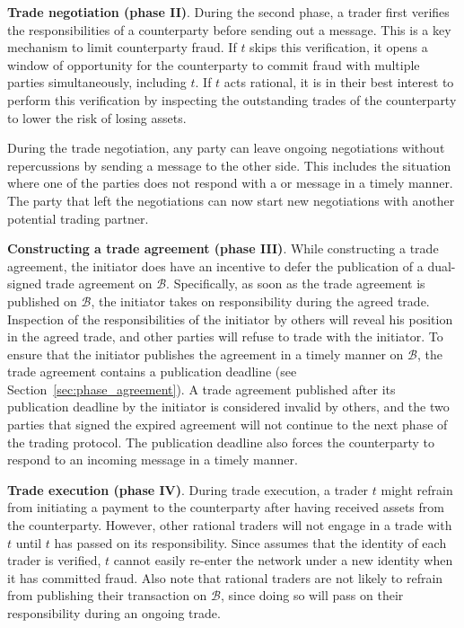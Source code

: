 \textbf{Trade negotiation (phase II)}.
During the second phase, a trader first verifies the responsibilities of a counterparty before sending out a \MsgTrdProp{} message.
This is a key mechanism to limit counterparty fraud.
If $ t $ skips this verification, it opens a window of opportunity for the counterparty to commit fraud with multiple parties simultaneously, including $ t $.
If $ t $ acts rational, it is in their best interest to perform this verification by inspecting the outstanding trades of the counterparty to lower the risk of losing assets.

During the trade negotiation, any party can leave ongoing negotiations without repercussions by sending a \MsgTrdReject{} message to the other side.
This includes the situation where one of the parties does not respond with a \MsgTrdNegotiate{} or \MsgTrdAccept{} message in a timely manner.
The party that left the negotiations can now start new negotiations with another potential trading partner.

\textbf{Constructing a trade agreement (phase III)}.
While constructing a trade agreement, the initiator does have an incentive to defer the publication of a dual-signed trade agreement on $ \mathcal{B} $.
Specifically, as soon as the trade agreement is published on $ \mathcal{B} $, the initiator takes on responsibility during the agreed trade.
Inspection of the responsibilities of the initiator by others will reveal his position in the agreed trade, and other parties will refuse to trade with the initiator.
To ensure that the initiator publishes the agreement in a timely manner on $ \mathcal{B} $, the trade agreement contains a publication deadline (see Section~\ref{sec:phase_agreement}).
A trade agreement published after its publication deadline by the initiator is considered invalid by others, and the two parties that signed the expired agreement will not continue to the next phase of the trading protocol.
The publication deadline also forces the counterparty to respond to an incoming \MsgPartialAgreement{} message in a timely manner.

\textbf{Trade execution (phase IV)}.
During trade execution, a trader $ t $ might refrain from initiating a payment to the counterparty after having received assets from the counterparty.
However, other rational traders will not engage in a trade with $ t $ until $ t $ has passed on its responsibility.
Since \ModelName{} assumes that the identity of each trader is verified, $ t $ cannot easily re-enter the network under a new identity when it has committed fraud.
Also note that rational traders are not likely to refrain from publishing their \TRPayment{} transaction on $ \mathcal{B} $, since doing so will pass on their responsibility during an ongoing trade.


